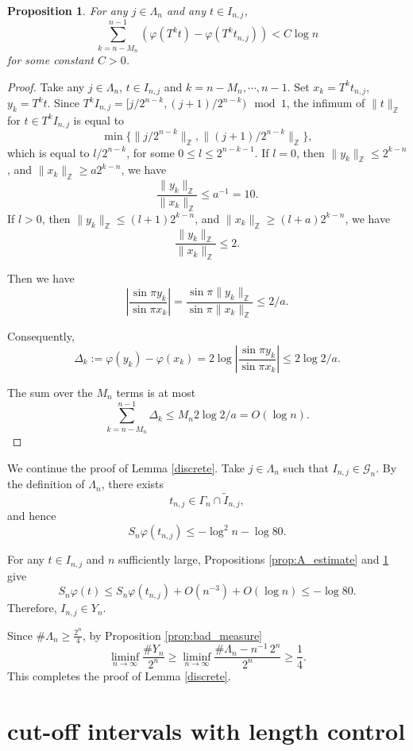 \documentclass{amsart}
\newtheorem{prop}[thm]{Proposition}
\theoremstyle{definition}
\begin{document}
\begin{prop}\label{prop:B_estimate}
For any $j\in\Lambda_n$ and any $t\in I_{n,j}$,
\[
\sum_{k=n-M_n}^{n-1} \left( \varphi(T^k t) - \varphi(T^k t_{n,j})\right) < C\log n
\]
for some constant $C>0$.
\end{prop}
\begin{proof}
Take any $j\in\Lambda_n$, $t\in I_{n,j}$ and $k=n-M_n,\cdots,n-1$.
Set $x_k = T^k t_{n,j}$, $y_k = T^k t$.
Since $T^k I_{n,j}=[j/2^{n-k},(j+1)/2^{n-k})\mod 1$,
the infimum of $\|t\|_{\mathbb{Z}}$ for $t\in T^k I_{n,j}$ is equal to
$$\min\{\|j/2^{n-k}\|_{\mathbb{Z}}, \|(j+1)/2^{n-k}\|_{\mathbb{Z}}\},$$
which is equal to $l/2^{n-k}$, for some $0\le l\le 2^{n-k-1}$.
If $l=0$, then $\|y_k\|_{\mathbb{Z}}\le 2^{k-n}$, and $\|x_k\|_{\mathbb{Z}}\ge a2^{k-n}$, 
we have
$$\frac{\|y_k\|_{\mathbb{Z}}}{\|x_k\|_{\mathbb{Z}}}\le a^{-1}=10.$$
If $l>0$, then $\|y_k\|_{\mathbb{Z}}\le (l+1)2^{k-n}$,
and $\|x_k\|_{\mathbb{Z}}\ge (l+a)2^{k-n}$, we have
$$\frac{\|y_k\|_{\mathbb{Z}}}{\|x_k\|_{\mathbb{Z}}}\le2.$$

Then we have
\[
\left|\frac{\sin\pi y_k}{\sin\pi x_k}\right|=
\frac{\sin\pi \|y_k\|_{\mathbb{Z}}}{\sin\pi \|x_k\|_{\mathbb{Z}}}\le 2/a.
\]

Consequently,
\[
\Delta_k:= \varphi(y_k) - \varphi(x_k) = 2\log\left|\frac{\sin\pi y_k}{\sin\pi x_k}\right|
\le 2\log 2/a.
\]

The sum over the $M_n$ terms is at most
\[
\sum_{k=n-M_n}^{n-1} \Delta_k \le M_n 2\log 2/a = O(\log n).
\]
\end{proof}

We continue the proof of Lemma \ref{discrete}.
Take $j\in \Lambda_n$
such that
$I_{n,j}\in \mathcal G_n.$
By the definition of \(\Lambda_n\), there exists
\[
t_{n,j}\in \Gamma_n\cap \widetilde I_{n,j},
\]
and hence
\[
S_n\varphi(t_{n,j})
\leq
-\log^2 n-\log 80.
\]

For any \(t\in I_{n,j}\) and $n$ sufficiently large, Propositions \ref{prop:A_estimate} and \ref{prop:B_estimate} give
\[
S_n\varphi(t)\le S_n\varphi(t_{n,j})+
O(n^{-3})+O(\log n)\le -\log80.
\] Therefore,
$I_{n,j}\in Y_n.$


Since $\#\Lambda_n\geq \frac{2^n}{4}$, by Proposition \ref{prop:bad_measure}
\[\liminf_{n\to\infty} \frac{\#Y_n}{2^n}\geq
\liminf_{n\to\infty}\frac{\#\Lambda_n-n^{-1}\,2^n}{2^n}
\ge \frac14. \]
This completes the proof of Lemma \ref{discrete}.%


\section{cut-off intervals with length control}
\end{document}
